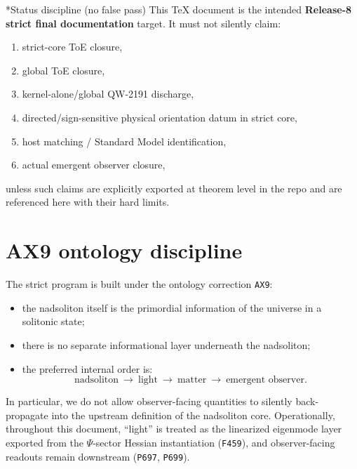 \documentclass[11pt,a4paper]{article}
\makeatletter
\newcommand{\chapter}{\@ifstar{\section*}{\section}}
\makeatother
\begin{document}
\chapter*{Status discipline (no false pass)}
This TeX document is the intended \textbf{Release-8 strict final documentation} target.
It must not silently claim:
\begin{enumerate}[label=\arabic*.]
  \item strict-core ToE closure,
  \item global ToE closure,
  \item kernel-alone/global QW-2191 discharge,
  \item directed/sign-sensitive physical orientation datum in strict core,
  \item host matching / Standard Model identification,
  \item actual emergent observer closure,
\end{enumerate}
unless such claims are explicitly exported at theorem level in the repo and are referenced here with their hard limits.



\tableofcontents

\chapter{Ontology and scope}
\section{AX9 ontology discipline}

The strict program is built under the ontology correction \texttt{AX9}:

\begin{itemize}
  \item the nadsoliton itself is the primordial information of the universe in a solitonic state;
  \item there is no separate informational layer underneath the nadsoliton;
  \item the preferred internal order is:
  \[
    \text{nadsoliton}\ \to\ \text{light}\ \to\ \text{matter}\ \to\ \text{emergent observer}.
  \]
\end{itemize}

In particular, we do not allow observer-facing quantities to silently back-propagate into the upstream definition of the nadsoliton core.
Operationally, throughout this document, “light” is treated as the linearized eigenmode layer exported from the $\Psi$-sector Hessian instantiation (\texttt{F459}),
and observer-facing readouts remain downstream (\texttt{P697}, \texttt{P699}).
\end{document}
